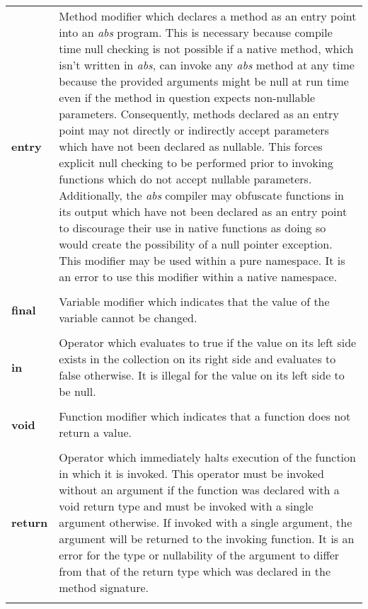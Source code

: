\documentclass[hidelinks]{article}
\begin{document}
\begin{longtable}{ |p{4cm}|p{11cm}|  }
\textbf{entry} & Method modifier which declares a method as an entry point into an \textit{abs} program. This is necessary because compile time null checking is not possible if a native method, which isn't written in \textit{abs}, can invoke any \textit{abs} method at any time because the provided arguments might be null at run time even if the method in question expects non-nullable parameters. Consequently, methods declared as an entry point may not directly or indirectly accept parameters which have not been declared as nullable. This forces explicit null checking to be performed prior to invoking functions which do not accept nullable parameters. Additionally, the \textit{abs} compiler may obfuscate functions in its output which have not been declared as an entry point to discourage their use in native functions as doing so would create the possibility of a null pointer exception. This modifier may be used within a pure namespace. It is an error to use this modifier within a native namespace. \\
&\\
\textbf{final} & Variable modifier which indicates that the value of the variable cannot be changed. \\
&\\
\textbf{in} & Operator which evaluates to true if the value on its left side exists in the collection on its right side and evaluates to false otherwise. It is illegal for the value on its left side to be null. \\
&\\
\textbf{void} & Function modifier which indicates that a function does not return a value. \\
&\\
\textbf{return} & Operator which immediately halts execution of the function in which it is invoked. This operator must be invoked without an argument if the function was declared with a void return type and must be invoked with a single argument otherwise. If invoked with a single argument, the argument will be returned to the invoking function. It is an error for the type or nullability of the argument to differ from that of the return type which was declared in the method signature. \\
& \\
\hline
\end{longtable}
\end{document}
